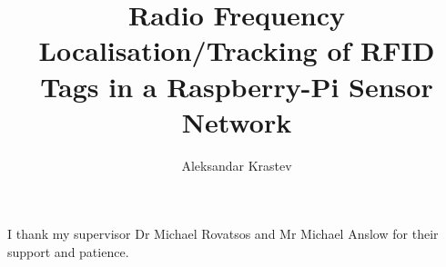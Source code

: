 \documentclass[msc, cs, deptreport, singlespacing, twoside]{infthesis}
\title{Radio Frequency Localisation/Tracking of RFID Tags in a Raspberry-Pi Sensor Network}
\author{Aleksandar Krastev}
\begin{document}
\begin{preliminary}
\maketitle

\begin{acknowledgements}
I thank my supervisor Dr Michael Rovatsos and Mr Michael Anslow for their support and patience.
\end{acknowledgements}

\standarddeclaration

\tableofcontents
\end{preliminary}









\appendix




\end{document}
